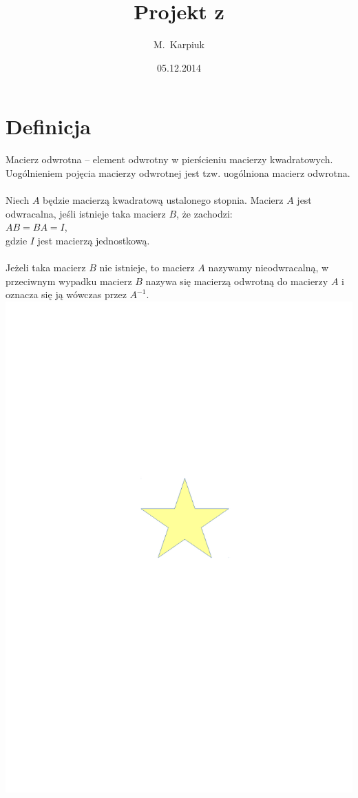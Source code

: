 \documentclass[12pt, a4paper]{article}
\author{M.~Karpiuk}
\title{Projekt z \LaTeXe}
\date{05.12.2014}
\begin{document}
\maketitle


\newpage
\tableofcontents


\newpage
\section{Definicja}
\indent
Macierz odwrotna – element odwrotny w pierścieniu macierzy kwadratowych. Uogólnieniem pojęcia macierzy odwrotnej jest tzw. uogólniona macierz odwrotna.
\\\\
\indent
Niech $A$ będzie macierzą kwadratową ustalonego stopnia. Macierz $A$ jest odwracalna, jeśli istnieje taka macierz $B$, że zachodzi:
\\
\indent
$AB = BA = I$,
\\
gdzie $I$ jest macierzą jednostkową.
\\\\
Jeżeli taka macierz $B$ nie istnieje, to macierz $A$ nazywamy nieodwracalną, w przeciwnym wypadku macierz $B$ nazywa się macierzą odwrotną do macierzy $A$ i oznacza się ją wówczas przez $A^{-1}$.
\\
\includegraphics{grafika_w.pdf}
\\
\end{document}
